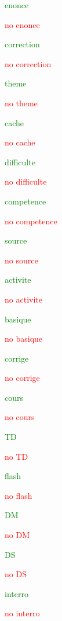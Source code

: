 \documentclass{classe-tex3R-2-1}
\begin{document}

\ifenonce \textcolor{green}{enonce}\par \else \hfill \textcolor{red}{no} \textcolor{red}{enonce}\par \fi
\ifcorrection \textcolor{green}{correction}\par \else \hfill \textcolor{red}{no} \textcolor{red}{correction}\par \fi



\iftheme \textcolor{green}{theme}\par \else \hfill \textcolor{red}{no} \textcolor{red}{theme}\par \fi
\ifcache \textcolor{green}{cache}\par \else \hfill \textcolor{red}{no} \textcolor{red}{cache}\par \fi
\ifdifficulte \textcolor{green}{difficulte}\par \else \hfill \textcolor{red}{no} \textcolor{red}{difficulte}\par \fi
\ifcompetence \textcolor{green}{competence}\par \else \hfill \textcolor{red}{no} \textcolor{red}{competence}\par \fi
\ifsource \textcolor{green}{source}\par \else \hfill \textcolor{red}{no} \textcolor{red}{source}\par \fi


\bigskip

\ifactivite \textcolor{green}{activite}\par \else \hfill \textcolor{red}{no} \textcolor{red}{activite}\par \fi
\ifbasique \textcolor{green}{basique}\par \else \hfill \textcolor{red}{no} \textcolor{red}{basique}\par \fi
\ifcorrige \textcolor{green}{corrige}\par \else \hfill \textcolor{red}{no} \textcolor{red}{corrige}\par \fi
\ifcours \textcolor{green}{cours}\par \else \hfill \textcolor{red}{no} \textcolor{red}{cours}\par \fi
\ifTD \textcolor{green}{TD}\par \else \hfill \textcolor{red}{no} \textcolor{red}{TD}\par \fi
\ifflash \textcolor{green}{flash}\par \else \hfill \textcolor{red}{no} \textcolor{red}{flash}\par \fi
\ifDM \textcolor{green}{DM}\par \else \hfill \textcolor{red}{no} \textcolor{red}{DM}\par \fi
\ifDS \textcolor{green}{DS}\par \else \hfill \textcolor{red}{no} \textcolor{red}{DS}\par \fi
\ifinterro \textcolor{green}{interro}\par \else \hfill \textcolor{red}{no} \textcolor{red}{interro}\par \fi
\end{document}
